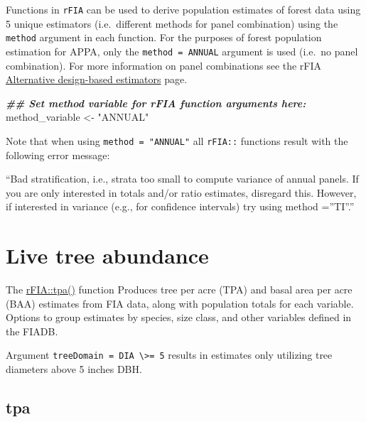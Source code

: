 \documentclass[
]{book}
\newenvironment{Shaded}{\begin{snugshade}}{\end{snugshade}}
\newcommand{\DocumentationTok}[1]{\textcolor[rgb]{0.56,0.35,0.01}{\textbf{\textit{#1}}}}
\newcommand{\NormalTok}[1]{#1}
\newcommand{\OtherTok}[1]{\textcolor[rgb]{0.56,0.35,0.01}{#1}}
\newcommand{\StringTok}[1]{\textcolor[rgb]{0.31,0.60,0.02}{#1}}
\begin{document}
Functions in \texttt{rFIA} can be used to derive population estimates of forest data using 5 unique estimators (i.e.~different methods for panel combination) using the \texttt{method} argument in each function. For the purposes of forest population estimation for APPA, only the \texttt{method\ =\ ANNUAL} argument is used (i.e.~no panel combination). For more information on panel combinations see the rFIA \href{https://rfia.netlify.app/tutorial/ae/}{Alternative design-based estimators} page.

\begin{Shaded}
\begin{Highlighting}[]
\DocumentationTok{\#\# Set method variable for rFIA function arguments here:}
\NormalTok{method\_variable }\OtherTok{\textless{}{-}} \StringTok{"ANNUAL"}
\end{Highlighting}
\end{Shaded}

Note that when using \texttt{method\ =\ "ANNUAL"} all \texttt{rFIA::} functions result with the following error message:

``Bad stratification, i.e., strata too small to compute variance of annual panels. If you are only interested in totals and/or ratio estimates, disregard this. However, if interested in variance (e.g., for confidence intervals) try using method =''TI''.''

\hypertarget{live-tree-abundance}{%
\section{Live tree abundance}\label{live-tree-abundance}}

The \href{https://rdrr.io/cran/rFIA/man/tpa.html}{rFIA::tpa()} function Produces tree per acre (TPA) and basal area per acre (BAA) estimates from FIA data, along with population totals for each variable. Options to group estimates by species, size class, and other variables defined in the FIADB.

Argument \texttt{treeDomain\ =\ DIA\ \textbackslash{}\textgreater{}=\ 5} results in estimates only utilizing tree diameters above 5 inches DBH.

\hypertarget{tpa}{%
\subsection{tpa}\label{tpa}}
\end{document}
